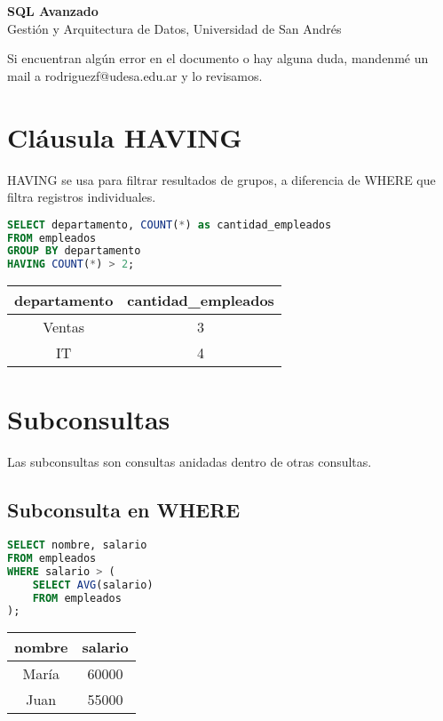 \documentclass[12pt]{article}
\begin{document}
\begin{center}
  {\LARGE \textbf{SQL Avanzado}}\\[0.5em]
  {Gestión y Arquitectura de Datos, Universidad de San Andrés}
\end{center}

Si encuentran algún error en el documento o hay alguna duda, mandenmé un mail a rodriguezf@udesa.edu.ar y lo revisamos.

\section{Cláusula HAVING}
HAVING se usa para filtrar resultados de grupos, a diferencia de WHERE que filtra registros individuales.

\begin{lstlisting}[language=SQL]
SELECT departamento, COUNT(*) as cantidad_empleados
FROM empleados
GROUP BY departamento
HAVING COUNT(*) > 2;
\end{lstlisting}

\begin{center}
\begin{tabular}{cc}
\toprule
departamento & cantidad\_empleados \\
\midrule
Ventas & 3 \\
IT & 4 \\
\bottomrule
\end{tabular}
\end{center}

\section{Subconsultas}
Las subconsultas son consultas anidadas dentro de otras consultas.

\subsection{Subconsulta en WHERE}
\begin{lstlisting}[language=SQL]
SELECT nombre, salario
FROM empleados
WHERE salario > (
    SELECT AVG(salario)
    FROM empleados
);
\end{lstlisting}

\begin{center}
\begin{tabular}{cc}
\toprule
nombre & salario \\
\midrule
María & 60000 \\
Juan & 55000 \\
\bottomrule
\end{tabular}
\end{center}
\end{document}
